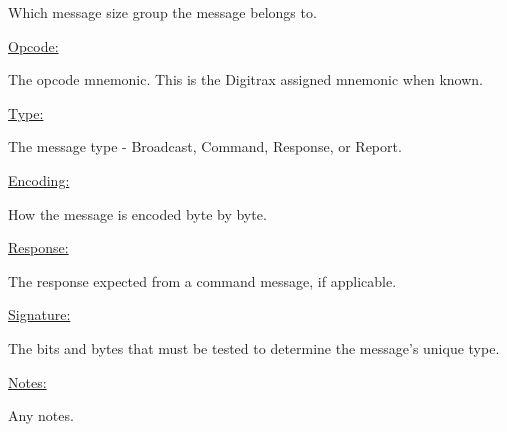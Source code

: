 Which message size group the message belongs to.

\underline{Opcode:}

The opcode mnemonic. This is the Digitrax assigned mnemonic when known.

\underline{Type:}

The message type - \gls{Broadcast}, \gls{Command}, \gls{Response}, or \gls{Report}.

\underline{Encoding:} 

How the message is encoded byte by byte.

\underline{Response:} 

The response expected from a command message, if applicable.

\underline{Signature:}

The bits and bytes that must be tested to determine the message's unique type.

\underline{Notes:} 

Any notes.








































































